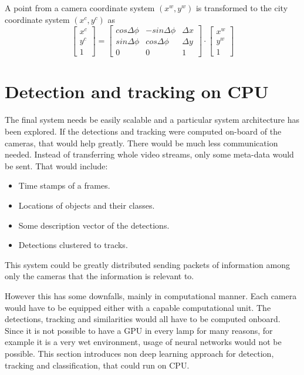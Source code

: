 \documentclass[a4paper,12pt,titlepage, twoside]{article}
\numberwithin{figure}{section}
\begin{document}
A point from a camera coordinate system $(x^w, y^w)$ is transformed to the city coordinate system $(x^c, y^c)$ as
\[
  \begin{bmatrix}
    x^c \\
    y^c \\
    1
  \end{bmatrix}
   = 
  \begin{bmatrix}
    cos\Delta\phi & -sin\Delta\phi & \Delta x\\
    sin\Delta\phi & cos\Delta\phi & \Delta y\\
    0 & 0 & 1
  \end{bmatrix}   
  \cdot 
  \begin{bmatrix}
    x^w \\
    y^w \\
    1
  \end{bmatrix}
\]








\section{Detection and tracking on CPU}
\label{sec:classical}
The final system needs be easily scalable and a particular system architecture has been explored. If the detections and tracking were computed on-board of the cameras, that would help greatly. There would be much less communication needed. Instead of transferring whole video streams, only some meta-data would be sent. That would include: 

\begin{itemize}
\item Time stamps of a frames.
\item Locations of objects and their classes.
\item Some description vector of the detections.
\item Detections clustered to tracks.
\end{itemize}

This system could be greatly distributed sending packets of information among only the cameras that the information is relevant to.

However this has some downfalls, mainly in computational manner. Each camera would have to be equipped either with a capable computational unit. The detections, tracking and similarities would all have to be computed onboard. Since it is not possible to have a GPU in every lamp for many reasons, for example it is a very wet environment, usage of neural networks would not be possible. This section introduces non deep learning approach for detection, tracking and classification, that could run on CPU.
\end{document}
